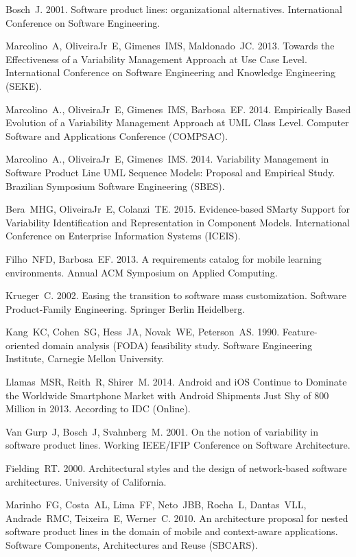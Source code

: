 \documentclass[preprint,12pt]{elsarticle}
\begin{document}
\begin{thebibliography}{33}
 Bosch~J. 2001. Software product lines: organizational alternatives. International Conference on Software Engineering.

 Marcolino~A, OliveiraJr~E, Gimenes~IMS, Maldonado~JC. 2013. Towards the Effectiveness of a Variability Management Approach at Use Case Level. International Conference on Software Engineering and Knowledge Engineering (SEKE).

 Marcolino~A., OliveiraJr~E, Gimenes~IMS, Barbosa~EF. 2014. Empirically Based Evolution of a Variability Management Approach at UML Class Level. Computer Software and Applications Conference (COMPSAC).

 Marcolino~A., OliveiraJr~E, Gimenes~IMS. 2014. Variability Management in Software Product Line UML Sequence Models: Proposal and Empirical Study. Brazilian Symposium Software Engineering (SBES).

 Bera~MHG, OliveiraJr~E, Colanzi~TE. 2015. Evidence-based SMarty Support for Variability Identification and Representation in Component Models. International Conference on Enterprise Information Systems (ICEIS).

 Filho~NFD, Barbosa~EF. 2013. A requirements catalog for mobile learning environments. Annual ACM Symposium on Applied Computing.

 Krueger~C. 2002. Easing the transition to software mass customization. Software Product-Family Engineering. Springer Berlin Heidelberg.

 Kang~KC, Cohen~SG, Hess~JA, Novak~WE, Peterson~AS. 1990. Feature-oriented domain analysis (FODA) feasibility study. Software Engineering Institute, Carnegie Mellon University.

 Llamas~MSR, Reith~R, Shirer~M. 2014. Android and iOS Continue to Dominate the Worldwide Smartphone Market with Android Shipments Just Shy of 800 Million in 2013. According to IDC (Online).

 Van Gurp~J, Bosch~J, Svahnberg~M. 2001. On the notion of variability in software product lines. Working IEEE/IFIP Conference on Software Architecture.

 Fielding~RT. 2000. Architectural styles and the design of network-based software architectures. University of California.

 Marinho~FG, Costa~AL, Lima~FF, Neto~JBB, Rocha~L, Dantas~VLL, Andrade~RMC, Teixeira~E, Werner~C. 2010. An architecture proposal for nested software product lines in the domain of mobile and context-aware applications. Software Components, Architectures and Reuse (SBCARS).


\end{thebibliography}
\end{document}
